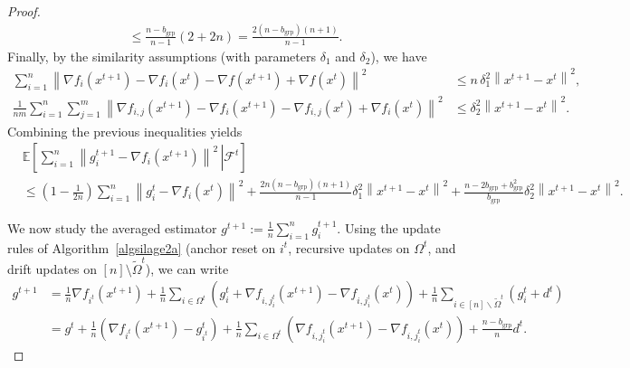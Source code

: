\documentclass{article}
\newcommand{\sqn}[1]{\left\| #1 \right\|^2}
\newcommand{\eqdef}{:=}
\newcommand{\Expb}[2]{\mathbb{E}\!\left[\left. #1\,\right|#2 \right]}
\newcommand{\Expc}[1]{\Expb{#1}{\mathcal{F}^t}}
\theoremstyle{plain}
\begin{document}
\begin{proof}
\begin{align*}
\leq \frac{n-b_{\mathrm{grp}}}{n-1}\left(2+2n\right)
=\frac{2(n-b_{\mathrm{grp}})(n+1)}{n-1}.
\end{align*}
Finally, by the similarity assumptions (with parameters $\delta_1$ and $\delta_2$), we have
\begin{align*}
\sum_{i=1}^n\sqn{\nabla f_{i}(x^{t+1})-\nabla f_{i}(x^{t})-\nabla f(x^{t+1})+\nabla f(x^{t})}
&\leq n\,\delta_1^2\sqn{x^{t+1}-x^t},\\
\frac{1}{nm}\sum_{i=1}^n\sum_{j=1}^m
\sqn{\nabla f_{i,j}(x^{t+1})- \nabla f_{i}(x^{t+1})-\nabla f_{i,j}(x^{t})+\nabla f_{i}(x^{t})}
&\leq \delta_2^2\sqn{x^{t+1}-x^t}.
\end{align*}
Combining the previous inequalities yields
\begin{align*}
&\Expc{\sum_{i=1}^n \sqn{g_i^{t+1}-\nabla f_i(x^{t+1})}}\\
&\leq\left(1-\frac{1}{2n}\right)\sum_{i=1}^n\sqn{g_i^t - \nabla f_i(x^{t})}
+\frac{2n(n-b_{\mathrm{grp}})(n+1)}{n-1}\delta_1^2\sqn{x^{t+1}-x^t}
+\frac{n-2b_{\mathrm{grp}}+b_{\mathrm{grp}}^2}{b_{\mathrm{grp}}}\delta_2^2\sqn{x^{t+1}-x^t}.
\end{align*}

\medskip

We now study the averaged estimator $g^{t+1}\eqdef \frac{1}{n}\sum_{i=1}^n g_i^{t+1}$.
Using the update rules of Algorithm~\ref{algsilage2a} (anchor reset on $i^t$, recursive updates on $\Omega^t$,
and drift updates on $[n]\setminus\tilde{\Omega}^t$), we can write
\begin{align*}
g^{t+1}
&=\frac{1}{n}\nabla f_{i^t}(x^{t+1})
+\frac{1}{n}\sum_{i\in\Omega^t}\left(g_{i}^t+ \nabla f_{i,j_i^t}(x^{t+1})-\nabla f_{i,j_i^t}(x^{t})\right)
+\frac{1}{n}\sum_{i\in [n]\backslash\tilde{\Omega}^t}\left(g_{i}^t+ d^t\right)\\
&=g^t + \frac{1}{n}\left(\nabla f_{i^t}(x^{t+1})-g_{i^t}^t\right)
+\frac{1}{n}\sum_{i\in\Omega^t}\left( \nabla f_{i,j_i^t}(x^{t+1})-\nabla f_{i,j_i^t}(x^{t})\right)
+\frac{n-b_{\mathrm{grp}}}{n} d^t.
\end{align*}


\end{proof}
\end{document}
